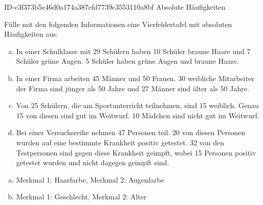 \begin{exercise}
      {ID-c3f373b5c46d0a174a387efd7739c3553110a8bf}
      {Absolute Häufigkeiten}
  \ifproblem\problem\par
    Fülle mit den folgenden Informationen eine Vierfeldertafel mit
    absoluten Häufigkeiten aus:
    \begin{enumerate}[a)]
      \item In einer Schulklasse mit \num{29} Schülern haben \num{10} Schüler braune Haare
            und \num{7} Schüler grüne Augen. \num{5} Schüler haben grüne Augen und braune Haare.
      \item In einer Firma arbeiten \num{45} Männer und \num{50} Frauen. \num{30} weibliche Mitarbeiter
            der Firma sind jünger als 50 Jahre und \num{27} Männer sind älter als 50 Jahre.
      \item Von \num{25} Schülern, die am Sportunterricht teilnehmen, sind \num{15} weiblich.
            Genau \num{15} von diesen sind gut im Weitwurf.
            \num{10} Mädchen sind nicht gut im Weitwurf.
      \item Bei einer Versuchsreihe nehmen \num{47} Personen teil. \num{20} von diesen Personen
            wurden auf eine bestimmte Krankheit positiv getestet. \num{32} von den
            Testpersonen sind gegen diese Krankheit geimpft, wobei \num{15} Personen
            positiv getestet wurden und nicht dagegen geimpft sind.
    \end{enumerate}
  \fi
  \ifoutline\outline\par
    \begin{enumerate}[a)]
      \item Merkmal 1: Haarfarbe, Merkmal 2: Augenfarbe
      \item Merkmal 1: Geschlecht, Merkmal 2: Alter
        \begin{center}
          \begin{fourfoldtable}
          \end{fourfoldtable}%
          \hspace{3em}%
          \begin{fourfoldtable}%
          \end{fourfoldtable}%

\end{center}
\end{enumerate}
\end{exercise}
